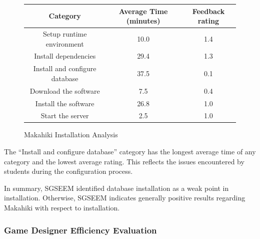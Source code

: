 \documentclass{sigchi}
\newcommand\tabhead[1]{\small\textbf{#1}}
\begin{document}
\begin{figure}[ht!]
  \centering
  \begin{tabular}{|c|c|c|}
    \hline
    \multicolumn{1}{|p{0.5\columnwidth}|}{\centering\tabhead{Category}} &
    \multicolumn{1}{|p{0.2\columnwidth}|}{\centering\tabhead{Average Time (minutes)}} &
    \multicolumn{1}{|p{0.2\columnwidth}|}{\centering\tabhead{Feedback rating}} \\
    \hline
    \multicolumn{1}{|p{0.5\columnwidth}|}{Setup runtime environment} &
    \multicolumn{1}{|p{0.2\columnwidth}|}{10.0} &
    \multicolumn{1}{|p{0.2\columnwidth}|}{1.4} \\
    \hline
    \multicolumn{1}{|p{0.5\columnwidth}|}{Install dependencies} &
    \multicolumn{1}{|p{0.2\columnwidth}|}{29.4} &
    \multicolumn{1}{|p{0.2\columnwidth}|}{1.3} \\
    \hline
    \multicolumn{1}{|p{0.5\columnwidth}|}{Install and configure database} &
    \multicolumn{1}{|p{0.2\columnwidth}|}{37.5} &
    \multicolumn{1}{|p{0.2\columnwidth}|}{0.1} \\
    \hline
    \multicolumn{1}{|p{0.5\columnwidth}|}{Download the software} &
    \multicolumn{1}{|p{0.2\columnwidth}|}{7.5} &
    \multicolumn{1}{|p{0.2\columnwidth}|}{0.4} \\
    \hline
    \multicolumn{1}{|p{0.5\columnwidth}|}{Install the software} &
    \multicolumn{1}{|p{0.2\columnwidth}|}{26.8} &
    \multicolumn{1}{|p{0.2\columnwidth}|}{1.0} \\
    \hline
    \multicolumn{1}{|p{0.5\columnwidth}|}{Start the server} &
    \multicolumn{1}{|p{0.2\columnwidth}|}{2.5} &
    \multicolumn{1}{|p{0.2\columnwidth}|}{1.0} \\
    \hline
  \end{tabular}
  \caption{Makahiki Installation Analysis}
  \label{fig:makahiki-install}
\end{figure}

The ``Install and configure database'' category has the longest average time of any category
and the lowest average rating. This reflects the issues encountered by students during the
configuration process.

In summary, SGSEEM identified database installation as a weak point in
installation.  Otherwise, SGSEEM indicates generally positive results regarding
Makahiki with respect to installation. 

\subsubsection{Game Designer Efficiency Evaluation}
\end{document}

